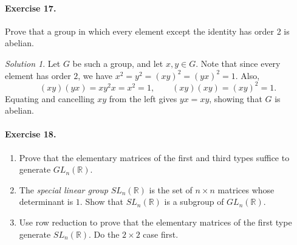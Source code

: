 \documentclass[11pt]{report}
\def\R{\mathbb{R}}
\theoremstyle{remark}
\newtheorem*{solution}{Solution}
\begin{document}
    \paragraph{Exercise 17.} Prove that a group in which every element except the
    identity has order 2 is abelian.
    \begin{solution}
        Let $G$ be such a group, and let $x, y \in G$. Note that since every element
        has order $2$, we have $x^2 = y^2 = (xy)^2 = (yx)^2 = 1$. Also, \[
            (xy)(yx) = xy^2x = x^2 = 1, \qquad (xy)(xy) = (xy)^2 = 1.
        \] Equating and cancelling $xy$ from the left gives $yx = xy$, showing that
        $G$ is abelian.
    \end{solution} 
    
    \paragraph{Exercise 18.} \mbox{}
    \begin{enumerate}
        \itemsep0em
        \item Prove that the elementary matrices of the first and third types
        suffice to generate $GL_n(\R)$.
        \item The \textit{special linear group} $SL_n(\R)$ is the set of $n \times
        n$ matrices whose determinant is $1$. Show that $SL_n(\R)$ is a subgroup of
        $GL_n(\R)$.
        \item Use row reduction to prove that the elementary matrices of the first
        type generate $SL_n(\R)$. Do the $2 \times 2$ case first.
    \end{enumerate}
\end{document}
